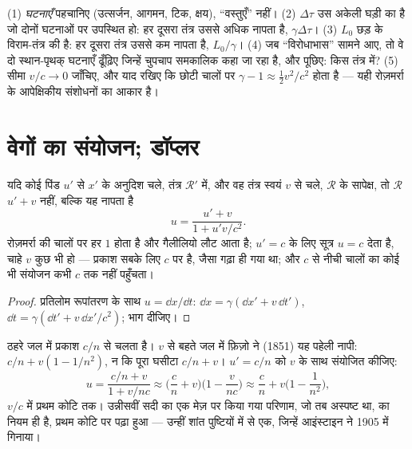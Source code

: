 \begin{method}[प्रभावों को सीधा रखना]\label{met:b3:relativistic-kinematics:method}
(1) \emph{घटनाएँ} पहचानिए (उत्सर्जन, आगमन, टिक, क्षय), ``वस्तुएँ''
नहीं। (2)  $\Delta\tau$ उस अकेली घड़ी का है जो
दोनों घटनाओं पर उपस्थित हो: हर दूसरा तंत्र उससे अधिक नापता है,
$\gamma\Delta\tau$। (3)  $L_0$ छड़ के विराम-तंत्र की
है: हर दूसरा तंत्र उससे कम नापता है, $L_0/\gamma$। (4) जब
``विरोधाभास'' सामने आए, तो वे दो स्थान-पृथक् घटनाएँ ढूँढ़िए जिन्हें
चुपचाप समकालिक कहा जा रहा है, और पूछिए: किस तंत्र में? (5) सीमा
$v/c \to 0$ जाँचिए, और याद रखिए कि छोटी चालों पर
$\gamma - 1 \approx \tfrac12 v^2/c^2$ होता है --- यही रोज़मर्रा के
आपेक्षिकीय संशोधनों का आकार है।
\end{method}

\section{वेगों का संयोजन; डॉप्लर}

\begin{proposition}[वेगों का आपेक्षिकीय संयोजन]\label{prop:b3:relativistic-kinematics:addition}
यदि कोई पिंड $u'$ से $x'$ के अनुदिश चले, तंत्र $\mathcal R'$ में, और वह
तंत्र स्वयं $v$ से चले, $\mathcal R$ के सापेक्ष, तो $\mathcal R$
$u' + v$ नहीं, बल्कि यह नापता है
\[
u = \frac{u' + v}{1 + u'v/c^2} .
\]
रोज़मर्रा की चालों पर हर $1$ होता है और गैलीलियो लौट आता है;
$u' = c$ के लिए सूत्र $u = c$ देता है, चाहे $v$ कुछ भी हो --- प्रकाश
सबके लिए $c$ पर है, जैसा गढ़ा ही गया था; और $c$ से नीची चालों का कोई भी
संयोजन कभी $c$ तक नहीं पहुँचता।
\end{proposition}

\begin{proof}
प्रतिलोम रूपांतरण के साथ $u = \dd x/\dd t$: $\dd x =
\gamma(\dd x' + v\,\dd t')$, $\dd t = \gamma(\dd t' + v\,\dd x'/c^2)$;
भाग दीजिए।
\end{proof}

\begin{example}[फ़्रेनेल का गुणांक, समझाया गया]\label{ex:b3:relativistic-kinematics:fizeau}
ठहरे जल में प्रकाश $c/n$ से चलता है। $v$ से बहते जल में फ़िज़ो ने
(1851) यह पहेली नापी: $c/n + v(1 - 1/n^2)$, न कि पूरा घसीटा
$c/n + v$। $u' = c/n$ को $v$ के साथ संयोजित कीजिए:
\[
u = \frac{c/n + v}{1 + v/nc}
\approx \Big(\frac{c}{n} + v\Big)\Big(1 - \frac{v}{nc}\Big)
\approx \frac{c}{n} + v\Big(1 - \frac{1}{n^2}\Big) ,
\]
$v/c$ में प्रथम कोटि तक। उन्नीसवीं सदी का एक मेज़ पर किया गया परिणाम,
जो तब अस्पष्ट था,  का नियम ही है, प्रथम कोटि पर पढ़ा हुआ ---
उन्हीं शांत पुष्टियों में से एक, जिन्हें आइंस्टाइन ने 1905 में गिनाया।
\end{example}

